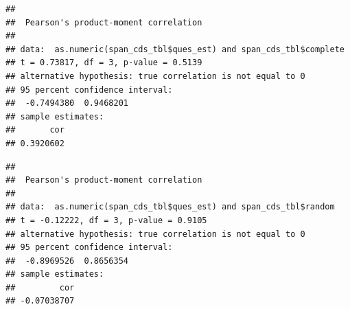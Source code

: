\documentclass[
]{article}
\newenvironment{Shaded}{\begin{snugshade}}{\end{snugshade}}
\newcommand{\KeywordTok}[1]{\textcolor[rgb]{0.13,0.29,0.53}{\textbf{#1}}}
\newcommand{\NormalTok}[1]{#1}
\newcommand{\OperatorTok}[1]{\textcolor[rgb]{0.81,0.36,0.00}{\textbf{#1}}}
\begin{document}
\begin{verbatim}
## 
##  Pearson's product-moment correlation
## 
## data:  as.numeric(span_cds_tbl$ques_est) and span_cds_tbl$complete
## t = 0.73817, df = 3, p-value = 0.5139
## alternative hypothesis: true correlation is not equal to 0
## 95 percent confidence interval:
##  -0.7494380  0.9468201
## sample estimates:
##       cor 
## 0.3920602
\end{verbatim}

\begin{Shaded}
\end{Shaded}

\begin{verbatim}
## 
##  Pearson's product-moment correlation
## 
## data:  as.numeric(span_cds_tbl$ques_est) and span_cds_tbl$random
## t = -0.12222, df = 3, p-value = 0.9105
## alternative hypothesis: true correlation is not equal to 0
## 95 percent confidence interval:
##  -0.8969526  0.8656354
## sample estimates:
##         cor 
## -0.07038707
\end{verbatim}
\end{document}
